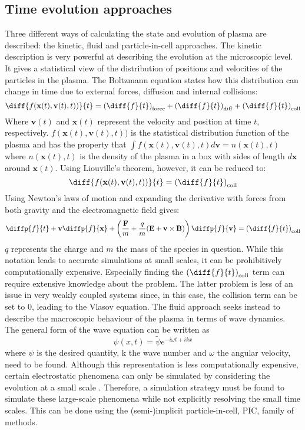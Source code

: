 \subsection{Time evolution approaches}
\label{subsec: plasma approaches}
Three different ways of calculating the state and evolution of plasma are described: the kinetic, fluid and particle-in-cell approaches. The kinetic description is very powerful at describing the evolution at the microscopic level. It gives a statistical view of the distribution of positions and velocities of the particles in the plasma. The Boltzmann equation states how this distribution can change in time due to external forces, diffusion and internal collisions:
\[\diff{f(\textbf{x}(t), \textbf{v}(t),t))}{t} =\left(\diff{f}{t}\right)_{\mathrm{force}}+\left(\diff{f}{t}\right)_{\mathrm{diff}}+ \left(\diff{f}{t}\right)_{\mathrm{coll}}\]
Where $\textbf{v}(t)$ and $\textbf{x}(t)$ represent the velocity and position at time $t$, respectively.
$f(\textbf{x}(t), \textbf{v}(t),t))$ is the statistical distribution function of the plasma and has the property that $\int f(\textbf{x}(t),\textbf{v}(t),t)d\textbf{v} = n(\textbf{x}(t),t)$ where $n(\textbf{x}(t),t)$ is the density of the plasma in a box with sides of length $d\textbf{x}$ around $\textbf{x}(t)$. Using Liouville's theorem, however, it can be reduced to:\[\diff{f(\textbf{x}(t), \textbf{v}(t),t))}{t} = \left(\diff{f}{t}\right)_{\mathrm{coll}}\]
Using Newton's laws of motion and expanding the derivative with forces from both gravity and the electromagnetic field gives:
\[\diffp{f}{t} + \textbf{v} \diffp{f}{{\textbf{x}}} + \left( \frac{\textbf{F}}{m} + \frac{q}{m}(\textbf{E} + \textbf{v} \times \textbf{B})\right)\diffp{f}{{\textbf{v}}}= \left(\diff{f}{t}\right)_{\mathrm{coll}}\]
 $q$ represents the charge and $m$ the mass of the species in question.
While this notation leads to accurate simulations at small scales, it can be prohibitively computationally expensive. Especially finding the $\left(\diff{f}{t}\right)_{\mathrm{coll}}$ term can require extensive knowledge about the problem. The latter problem is less of an issue in very weakly coupled systems since, in this case, the collision term can be set to 0, leading to the Vlasov equation.
\newline The fluid approach seeks instead to describe the macroscopic behaviour of the plasma in terms of wave dynamics. The general form of the wave equation can be written as \[\psi(x,t) = \tilde{\psi}e^{-i\omega t + i k x}\] where $\psi$ is the desired quantity, k the wave number and $\omega$ the angular velocity, need to be found.
\newline
Although this representation is less computationally expensive, certain electrostatic phenomena can only be simulated by considering the evolution at a small scale \cite{biskamp_magnetic_2000}. Therefore, a simulation strategy must be found to simulate these large-scale phenomena while not explicitly resolving the small time scales. This can be done using the (semi-)implicit particle-in-cell, PIC, family of methods. \cite{giovanni_lapenta_introduction_nodate}
\color{black}


